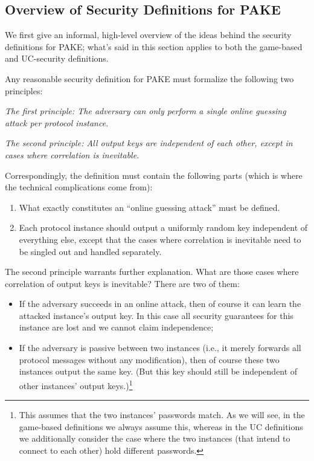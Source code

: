 \documentclass{article}
\begin{document}
\subsection{Overview of Security Definitions for PAKE}
\label{sec:principles}
We first give an informal, high-level overview of the ideas behind the security definitions for PAKE; what's said in this section applies to both the game-based and UC-security definitions.

Any reasonable security definition for PAKE must formalize the following two principles:
\begin{framed}
\begin{displayquote}
  \emph{The first principle: The adversary can only perform a single online guessing attack per protocol instance.}
  
  \emph{The second principle: All output keys are independent of each other, except in cases where correlation is inevitable.}
\end{displayquote}
\end{framed}
Correspondingly, the definition must contain the following parts (which is where the technical complications come from):
\begin{enumerate}
  \item What exactly constitutes an ``online guessing attack'' must be defined.
  \item Each protocol instance should output a uniformly random key independent of everything else, except that the cases where correlation is inevitable need to be singled out and handled separately. 
\end{enumerate}

The second principle warrants further explanation. What are those cases where correlation of output keys is inevitable? There are two of them:
\begin{itemize}
  \item If the adversary succeeds in an online attack, then of course it can learn the attacked instance's output key. In this case all security guarantees for this instance are lost and we cannot claim independence;
  \item If the adversary is passive between two instances (i.e., it merely forwards all protocol messages without any modification), then of course these two instances output the same key. (But this key should still be independent of other instances' output keys.)\footnote{This assumes that the two instances' passwords match. As we will see, in the game-based definitions we always assume this, whereas in the UC definitions we additionally consider the case where the two instances (that intend to connect to each other) hold different passwords.}
\end{itemize}
\end{document}
